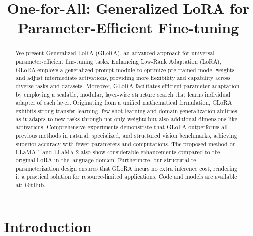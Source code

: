 \title{One-for-All: Generalized LoRA for Parameter-Efficient Fine-tuning}

\begin{abstract}
We present Generalized LoRA (GLoRA), an advanced approach for universal parameter-efficient fine-tuning tasks. Enhancing Low-Rank Adaptation (LoRA), GLoRA employs a generalized prompt module to optimize pre-trained model weights and adjust intermediate activations, providing more flexibility and capability across diverse tasks and datasets. Moreover, GLoRA facilitates efficient parameter adaptation by employing a scalable, modular, layer-wise structure search that learns individual adapter of each layer. Originating from a unified mathematical formulation, GLoRA exhibits strong transfer learning, few-shot learning and domain generalization abilities, as it adapts to new tasks through not only weights but also additional dimensions like activations. Comprehensive experiments demonstrate that GLoRA outperforms all previous methods in natural, specialized, and structured vision benchmarks, achieving superior accuracy with fewer parameters and computations. The proposed method on LLaMA-1 and LLaMA-2 also show considerable enhancements compared to the original LoRA in the language domain. Furthermore, our structural re-parameterization design ensures that GLoRA incurs no extra inference cost, rendering it a practical solution for resource-limited applications. Code and models are available at: \href{https://github.com/Arnav0400/ViT-Slim/tree/master/GLoRA}{GitHub}.
\end{abstract}

\section{Introduction}

